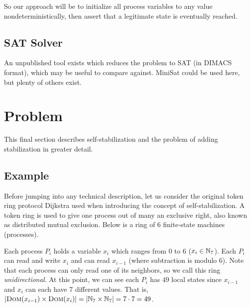 So our approach will be to initialize all process variables to any value nondeterministically, then assert that a legitimate state is eventually reached.

\subsection{SAT Solver}

An unpublished tool exists which reduces the problem to SAT (in DIMACS format), which may be useful to compare against.
MiniSat could be used here, but plenty of others exist.

\section{Problem}

This final section describes self-stabilization and the problem of adding stabilization in greater detail.

\subsection{Example}
Before jumping into any technical description, let us consider the original token ring protocol Dijkstra used when introducing the concept of self-stabilization.
A token ring is used to give one process out of many an exclusive right, also known as distributed mutual exclusion.
Below is a ring of $6$ finite-state machines (processes).


Each process $P_i$ holds a variable $x_i$ which ranges from $0$ to $6$ ($x_i\in\mathbb{N}_7$).
Each $P_i$ can read and write $x_i$ and can read $x_{i-1}$ (where subtraction is modulo $6$).
Note that each process can only read one of its neighbors, so we call this ring {\em unidirectional}.
At this point, we can see each $P_i$ has $49$ local states since $x_{i-1}$ and $x_i$ can each have $7$ different values.
That is, $\lvert\text{\normalfont\scshape Dom}(x_{i-1}) \times \text{\normalfont\scshape Dom}(x_i)\rvert = \lvert\mathbb{N}_7\times \mathbb{N}_7\rvert = 7 \cdot 7 = 49$.

